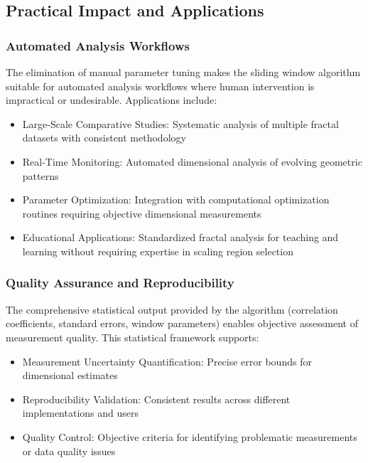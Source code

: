 \documentclass[preprint,12pt]{elsarticle}
\def\textbf#1{#1}%
\begin{document}
\subsection{Practical Impact and Applications}

\subsubsection{Automated Analysis Workflows}

The elimination of manual parameter tuning makes the sliding window algorithm suitable for automated analysis workflows where human intervention is impractical or undesirable. Applications include:

\begin{itemize}
\item \textbf{Large-Scale Comparative Studies}: Systematic analysis of multiple fractal datasets with consistent methodology
\item \textbf{Real-Time Monitoring}: Automated dimensional analysis of evolving geometric patterns
\item \textbf{Parameter Optimization}: Integration with computational optimization routines requiring objective dimensional measurements
\item \textbf{Educational Applications}: Standardized fractal analysis for teaching and learning without requiring expertise in scaling region selection
\end{itemize}

\subsubsection{Quality Assurance and Reproducibility}

The comprehensive statistical output provided by the algorithm (correlation coefficients, standard errors, window parameters) enables objective assessment of measurement quality. This statistical framework supports:

\begin{itemize}
\item \textbf{Measurement Uncertainty Quantification}: Precise error bounds for dimensional estimates
\item \textbf{Reproducibility Validation}: Consistent results across different implementations and users
\item \textbf{Quality Control}: Objective criteria for identifying problematic measurements or data quality issues
\end{itemize}
\end{document}
